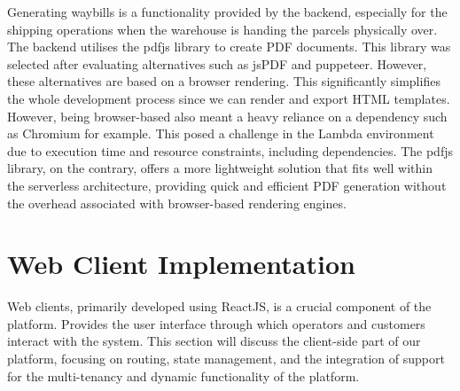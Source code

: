 Generating waybills is a functionality provided by the backend, especially for the shipping operations when the warehouse is handing the parcels physically over.
The backend utilises the \gls{pdfjs} library to create PDF documents.
This library was selected after evaluating alternatives such as \gls{jsPDF} and \gls{puppeteer}.
However, these alternatives are based on a browser rendering.
This significantly simplifies the whole development process since we can render and export HTML templates.
However, being browser-based also meant a heavy reliance on a dependency such as \Gls{Chromium} for example. 
This posed a challenge in the Lambda environment due to execution time and resource constraints, including dependencies.
The \gls{pdfjs} library, on the contrary, offers a more lightweight solution that fits well within the serverless architecture, providing quick and efficient PDF generation without the overhead associated with browser-based rendering engines.

\section{Web Client Implementation}
\label{sec:web-client-implementation}

Web clients, primarily developed using ReactJS, is a crucial component of the platform.
Provides the user interface through which operators and customers interact with the system.
This section will discuss the client-side part of our platform, focusing on routing, state management, and the integration of support for the multi-tenancy and dynamic functionality of the platform.

